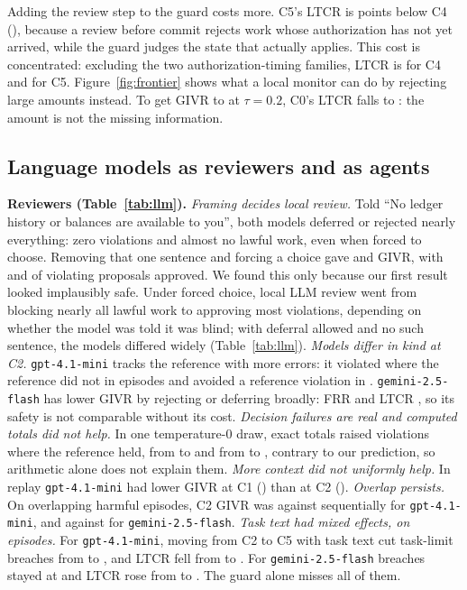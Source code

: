 \documentclass[10pt]{article}
\begin{document}
Adding the review step to the guard costs more. C5's LTCR is \ltcrDCfourCfive{} points below C4 (\ltcrDCfourCfiveCI{}), because a review before commit rejects work whose authorization has not yet arrived, while the guard judges the state that actually applies. This cost is concentrated: excluding the two authorization-timing families, LTCR is \ltcrCoreCfour{} for C4 and \ltcrCoreCfive{} for C5. Figure~\ref{fig:frontier} shows what a local monitor can do by rejecting large amounts instead. To get GIVR to \tauGivrTwo{} at $\tau=0.2$, C0's LTCR falls to \tauLtcrTwo{}: the amount is not the missing information.



\subsection{Language models as reviewers and as agents}\label{sec:llm}
\textbf{Reviewers (Table~\ref{tab:llm}).} \emph{Framing decides local review.} Told ``No ledger history or balances are available to you'', both models deferred or rejected nearly everything: zero violations and almost no lawful work, even when forced to choose. Removing that one sentence and forcing a choice gave \llmGptCzeronfGivr{} and \llmGemCzeronfGivr{} GIVR, with \llmGptCzeronfUar{} and \llmGemCzeronfUar{} of violating proposals approved. We found this only because our first result looked implausibly safe. Under forced choice, local LLM review went from blocking nearly all lawful work to approving most violations, depending on whether the model was told it was blind; with deferral allowed and no such sentence, the models differed widely (Table~\ref{tab:llm}). \emph{Models differ in kind at C2.} \texttt{gpt-4.1-mini} tracks the reference with more errors: it violated where the reference did not in \llmGptCtwoWorse{} episodes and avoided a reference violation in \llmGptCtwoBetter{}. \texttt{gemini-2.5-flash} has lower GIVR by rejecting or deferring broadly: FRR \llmGemCtwoFrr{} and LTCR \llmGemCtwoLtcr{}, so its safety is not comparable without its cost. \emph{Decision failures are real and computed totals did not help.} In one temperature-0 draw, exact totals raised violations where the reference held, from \llmGptCtwoWorse{} to \llmGptCtwoaggWorse{} and from \llmGemCtwoWorse{} to \llmGemCtwoaggWorse{}, contrary to our prediction, so arithmetic alone does not explain them. \emph{More context did not uniformly help.} In replay \texttt{gpt-4.1-mini} had lower GIVR at C1 (\llmGptConeGivr{}) than at C2 (\llmGptCtwoGivr{}). \emph{Overlap persists.} On overlapping harmful episodes, C2 GIVR was \llmGptCtwoOver{} against \llmGptCtwoSeq{} sequentially for \texttt{gpt-4.1-mini}, and \llmGemCtwoOver{} against \llmGemCtwoSeq{} for \texttt{gemini-2.5-flash}. \emph{Task text had mixed effects, on \llmGptCfiveScopeN{} episodes.} For \texttt{gpt-4.1-mini}, moving from C2 to C5 with task text cut task-limit breaches from \llmGptCtwoScopeK{} to \llmGptCfiveScopeK{}, and LTCR fell from \llmGptCtwoLtcr{} to \llmGptCfiveLtcr{}. For \texttt{gemini-2.5-flash} breaches stayed at \llmGemCfiveScopeK{} and LTCR rose from \llmGemCtwoLtcr{} to \llmGemCfiveLtcr{}. The guard alone misses all of them.
\end{document}
